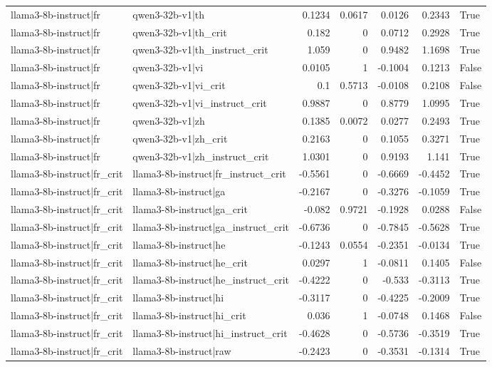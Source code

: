 \begin{table}
\begin{tabular}{l l r r r r l}
llama3-8b-instruct|fr & qwen3-32b-v1|th & 0.1234 & 0.0617 & 0.0126 & 0.2343 & True \\
llama3-8b-instruct|fr & qwen3-32b-v1|th_crit & 0.182 & 0 & 0.0712 & 0.2928 & True \\
llama3-8b-instruct|fr & qwen3-32b-v1|th_instruct_crit & 1.059 & 0 & 0.9482 & 1.1698 & True \\
llama3-8b-instruct|fr & qwen3-32b-v1|vi & 0.0105 & 1 & -0.1004 & 0.1213 & False \\
llama3-8b-instruct|fr & qwen3-32b-v1|vi_crit & 0.1 & 0.5713 & -0.0108 & 0.2108 & False \\
llama3-8b-instruct|fr & qwen3-32b-v1|vi_instruct_crit & 0.9887 & 0 & 0.8779 & 1.0995 & True \\
llama3-8b-instruct|fr & qwen3-32b-v1|zh & 0.1385 & 0.0072 & 0.0277 & 0.2493 & True \\
llama3-8b-instruct|fr & qwen3-32b-v1|zh_crit & 0.2163 & 0 & 0.1055 & 0.3271 & True \\
llama3-8b-instruct|fr & qwen3-32b-v1|zh_instruct_crit & 1.0301 & 0 & 0.9193 & 1.141 & True \\
llama3-8b-instruct|fr_crit & llama3-8b-instruct|fr_instruct_crit & -0.5561 & 0 & -0.6669 & -0.4452 & True \\
llama3-8b-instruct|fr_crit & llama3-8b-instruct|ga & -0.2167 & 0 & -0.3276 & -0.1059 & True \\
llama3-8b-instruct|fr_crit & llama3-8b-instruct|ga_crit & -0.082 & 0.9721 & -0.1928 & 0.0288 & False \\
llama3-8b-instruct|fr_crit & llama3-8b-instruct|ga_instruct_crit & -0.6736 & 0 & -0.7845 & -0.5628 & True \\
llama3-8b-instruct|fr_crit & llama3-8b-instruct|he & -0.1243 & 0.0554 & -0.2351 & -0.0134 & True \\
llama3-8b-instruct|fr_crit & llama3-8b-instruct|he_crit & 0.0297 & 1 & -0.0811 & 0.1405 & False \\
llama3-8b-instruct|fr_crit & llama3-8b-instruct|he_instruct_crit & -0.4222 & 0 & -0.533 & -0.3113 & True \\
llama3-8b-instruct|fr_crit & llama3-8b-instruct|hi & -0.3117 & 0 & -0.4225 & -0.2009 & True \\
llama3-8b-instruct|fr_crit & llama3-8b-instruct|hi_crit & 0.036 & 1 & -0.0748 & 0.1468 & False \\
llama3-8b-instruct|fr_crit & llama3-8b-instruct|hi_instruct_crit & -0.4628 & 0 & -0.5736 & -0.3519 & True \\
llama3-8b-instruct|fr_crit & llama3-8b-instruct|raw & -0.2423 & 0 & -0.3531 & -0.1314 & True \\

\end{tabular}
\end{table}
